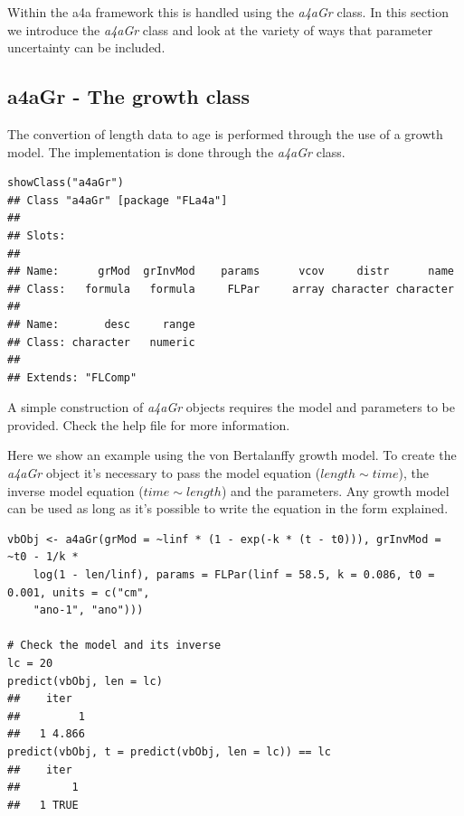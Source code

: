 \documentclass[a4paper,english,10pt]{article}\usepackage[]{graphicx}\usepackage[]{color}
\makeatletter
\newenvironment{kframe}{%
 \def\at@end@of@kframe{}%
 \ifinner\ifhmode%
  \def\at@end@of@kframe{\end{minipage}}%
  \begin{minipage}{\columnwidth}%
 \fi\fi%
 \def\FrameCommand##1{\hskip\@totalleftmargin \hskip-\fboxsep
 \colorbox{shadecolor}{##1}\hskip-\fboxsep
     \hskip-\linewidth \hskip-\@totalleftmargin \hskip\columnwidth}%
 \MakeFramed {\advance\hsize-\width
   \@totalleftmargin\z@ \linewidth\hsize
   \@setminipage}}%
 {\par\unskip\endMakeFramed%
 \at@end@of@kframe}
\newenvironment{knitrout}{}{} %
\newcommand{\class}[1]{{\textit{#1}}}
\makeatother
\begin{document}
Within the a4a framework this is handled using the \class{a4aGr} class. In this section we introduce the \class{a4aGr} class and look at the variety of ways that parameter uncertainty can be included.

\subsection{a4aGr - The growth class}

The convertion of length data to age is performed through the use of a growth model. The implementation is done through the \class{a4aGr} class.

\begin{knitrout}
\color{fgcolor}\begin{kframe}
\begin{verbatim}
showClass("a4aGr")
## Class "a4aGr" [package "FLa4a"]
## 
## Slots:
##                                                                   
## Name:      grMod  grInvMod    params      vcov     distr      name
## Class:   formula   formula     FLPar     array character character
##                           
## Name:       desc     range
## Class: character   numeric
## 
## Extends: "FLComp"
\end{verbatim}
\end{kframe}
\end{knitrout}


A simple construction of \class{a4aGr} objects requires the model and parameters to be provided.
Check the help file for more information.

Here we show an example using the von Bertalanffy growth model. To create the \class{a4aGr} object it's necessary to pass the model equation ($length \sim time$), the inverse model equation ($time \sim length$) and the parameters. Any growth model can be used as long as it's possible to write the equation in the form explained.

\begin{knitrout}
\color{fgcolor}\begin{kframe}
\begin{verbatim}
vbObj <- a4aGr(grMod = ~linf * (1 - exp(-k * (t - t0))), grInvMod = ~t0 - 1/k * 
    log(1 - len/linf), params = FLPar(linf = 58.5, k = 0.086, t0 = 0.001, units = c("cm", 
    "ano-1", "ano")))

# Check the model and its inverse
lc = 20
predict(vbObj, len = lc)
##    iter
##         1
##   1 4.866
predict(vbObj, t = predict(vbObj, len = lc)) == lc
##    iter
##        1
##   1 TRUE
\end{verbatim}
\end{kframe}
\end{knitrout}
\end{document}
